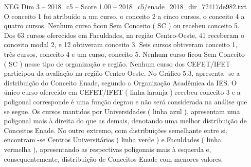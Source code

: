\begin{textsample}{NEG Dim 3 – 2018\_c5 – Score 1.00 – 2018\_c5/enade\_2018\_dir\_72417de982.txt}
O conceito 1 foi atribuído a um curso, o conceito 2 a cinco cursos, o conceito 4 a quatro cursos.
Nenhum curso ficou Sem Conceito ( SC ) ou recebeu conceito 5.
Dos 63 cursos oferecidos em Faculdades, na região Centro-Oeste, 41 receberam o conceito modal 2, e 12 obtiveram conceito 3.
Seis cursos obtiveram conceito 1, três cursos, conceito 4 e um curso, conceito 5.
Nenhum curso ficou Sem Conceito ( SC ) nesse tipo de organização e região.
Nenhum curso dos CEFET/IFET participou da avaliação na região Centro-Oeste.
No Gráfico 5.3, apresenta -se a distribuição do Conceito Enade, segundo a Organização Acadêmica da IES.
O único curso oferecido em CEFET/IFET ( linha laranja ) recebeu conceito 3 e a poligonal corresponde é uma função degrau e não será considerada na análise que se segue.
Os cursos mantidos por Universidades ( linha azul ), apresentam uma poligonal mais à direita do que as demais, denotando uma melhor distribuição de Conceitos Enade.
No outro extremo, com distribuições semelhante entre si, encontram -se Centros Universitários ( linha verde ) e Faculdades ( linha vermelha ), apresentando as respectivas poligonais mais à esquerda e, consequentemente, distribuição de Conceitos Enade com menores valores.

\end{textsample}
